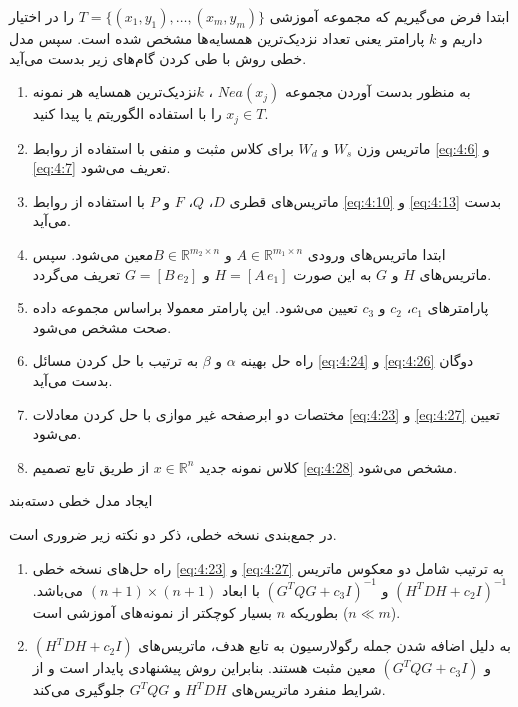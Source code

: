 \begin{algorithm}[!h]
\begin{steps}

	ابتدا فرض می‌گیریم که مجموعه آموزشی $T=\{(x_1, y_1),\dots,(x_m, y_m)\}$  را در اختیار داریم و $k$ پارامتر یعنی تعداد نزدیک‌ترین همسایه‌ها مشخص شده است. سپس مدل خطی روش  با طی کردن گام‌های زیر بدست می‌آید.
	
	\begin{enumerate}
		\item به منظور بدست آوردن مجموعه $Nea(x_{j})$ ،  $k$نزدیک‌ترین همسایه هر نمونه  $x_{j} \in T$ را با استفاده الگوریتم  یا  پیدا کنید.
		\item ماتریس وزن $W_s$  و $W_d$  برای کلاس مثبت و منفی با استفاده از روابط \ref{eq:4:6} و \ref{eq:4:7}  تعریف می‌شود.
		\item ماتریس‌های قطری  $D$،  $Q$، $F$  و $P$  با استفاده از روابط \ref{eq:4:10} و \ref{eq:4:13} بدست می‌آید.
		\item ابتدا ماتریس‌های ورودی  $A \in \mathbb{R}^{m_1 \times n}$ و   $B \in \mathbb{R}^{m_2 \times n}$معین می‌شود. سپس ماتریس‌های  $H$  و $G$  به این صورت  $H=[A\,e_{1}]$ و $G=[B\,e_{2}]$ تعریف می‌گردد.
		\item پارامترهای  $c_{1}$، $c_{2}$  و $c_{3}$ تعیین می‌شود. این پارامتر معمولا براساس مجموعه داده صحت مشخص می‌شود.
		\item راه حل بهینه $\alpha$  و $\beta$  به ترتیب با حل کردن مسائل \ref{eq:4:24} و \ref{eq:4:26} دوگان بدست می‌آید.
		\item مختصات دو ابرصفحه غیر موازی با حل کردن معادلات \ref{eq:4:23} و \ref{eq:4:27} تعیین می‌شود.
		\item کلاس نمونه جدید  $x \in \mathbb{R}^{n}$ از طریق تابع تصمیم \ref{eq:4:28} مشخص می‌شود.
	\end{enumerate}
\end{steps}
\caption{ایجاد مدل خطی دسته‌بند }
\label{algo:Linear-RKNN-TSVM}
\end{algorithm}

در جمع‌بندی نسخه خطی، ذکر دو نکته زیر ضروری است.
\begin{enumerate}
	\item راه حل‌های نسخه خطی \ref{eq:4:23} و \ref{eq:4:27} به ترتیب شامل دو معکوس ماتریس   $(H^{T}DH+c_{2}I)^{-1}$ و  $(G^{T}QG+c_{3}I)^{-1}$ با ابعاد $(n+1)\times(n+1)$  می‌باشد. بطوریکه $n$ بسیار کوچکتر از نمونه‌های آموزشی است ($n \ll m$).
	\item به دلیل اضافه شدن جمله رگولارسیون به تابع هدف، ماتریس‌های   $(H^{T}DH+c_{2}I)$ و   $(G^{T}QG+c_{3}I)$ معین مثبت هستند. بنابراین روش پیشنهادی پایدار است و از شرایط منفرد ماتریس‌های $H^{T}DH$ و $G^{T}QG$  جلوگیری می‌کند.
\end{enumerate}


